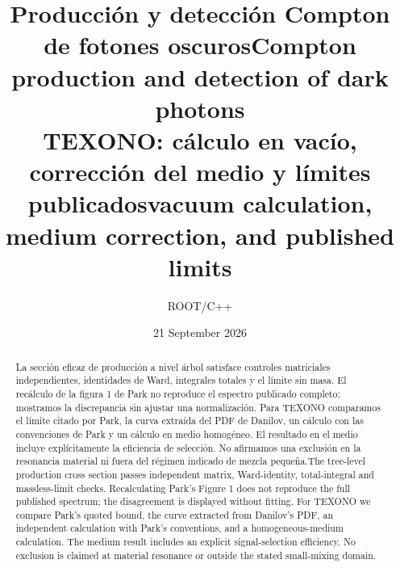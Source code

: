 \newcommand{\both}[2]{\ifspanish #2\else #1\fi}
\newcommand{\slsh}[1]{\not\!#1}
\setlength{\emergencystretch}{2em}
\ifspanish\renewcommand{\abstractname}{Resumen}\renewcommand{\figurename}{Figura}\renewcommand{\refname}{Referencias}\fi
\title{\both{Compton production and detection of dark photons}{Producción y detección Compton de fotones oscuros}\\\large TEXONO: \both{vacuum calculation, medium correction, and published limits}{cálculo en vacío, corrección del medio y límites publicados}}
\author{ROOT/C++}\date{21 September 2026}
\maketitle
\begin{abstract}
\both{The tree-level production cross section passes independent matrix, Ward-identity, total-integral and massless-limit checks. Recalculating Park's Figure 1 does not reproduce the full published spectrum; the disagreement is displayed without fitting. For TEXONO we compare Park's quoted bound, the curve extracted from Danilov's PDF, an independent calculation with Park's conventions, and a homogeneous-medium calculation. The medium result includes an explicit signal-selection efficiency. No exclusion is claimed at material resonance or outside the stated small-mixing domain.}
{La sección eficaz de producción a nivel árbol satisface controles matriciales independientes, identidades de Ward, integrales totales y el límite sin masa. El recálculo de la figura 1 de Park no reproduce el espectro publicado completo; mostramos la discrepancia sin ajustar una normalización. Para TEXONO comparamos el límite citado por Park, la curva extraída del PDF de Danilov, un cálculo con las convenciones de Park y un cálculo en medio homogéneo. El resultado en el medio incluye explícitamente la eficiencia de selección. No afirmamos una exclusión en la resonancia material ni fuera del régimen indicado de mezcla pequeña.}
\end{abstract}
